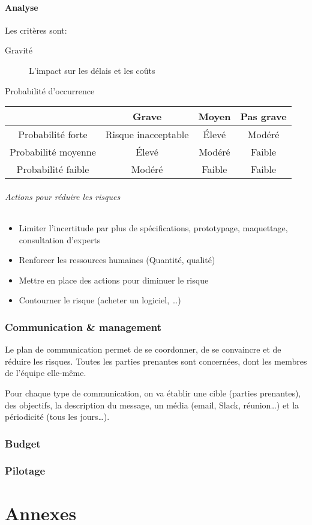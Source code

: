 \documentclass[10pt,a4paper,french]{article}
\begin{document}
\subsection{Analyse}

Les critères sont:
\begin{description}
\item[Gravité] L'impact sur les délais et les coûts
\item[Probabilité d'occurrence]
\end{description}

\begin{tabular}{c|ccc}
& Grave & Moyen & Pas grave \\
\hline
Probabilité forte & Risque inacceptable & Élevé & Modéré \\
Probabilité moyenne & Élevé & Modéré & Faible \\
Probabilité faible & Modéré & Faible & Faible
\end{tabular}

\paragraph{Actions pour réduire les risques}
\begin{itemize}
\item Limiter l'incertitude par plus de spécifications, prototypage, maquettage, consultation d'experts
\item Renforcer les ressources humaines (Quantité, qualité)
\item Mettre en place des actions pour diminuer le risque
\item Contourner le risque (acheter un logiciel, \ldots)
\end{itemize}

\section{Communication \& management}

Le plan de communication permet de se coordonner, de se convaincre et de réduire les risques. Toutes les parties prenantes sont concernées, dont les membres de l'équipe elle-même.

Pour chaque type de communication, on va établir une cible (parties prenantes), des objectifs, la description du message, un média (email, Slack, réunion\ldots) et la périodicité (tous les jours\ldots).

\section{Budget}

\section{Pilotage}

\appendix %
\part{Annexes}
\printglossaries
\printindex
\end{document}
